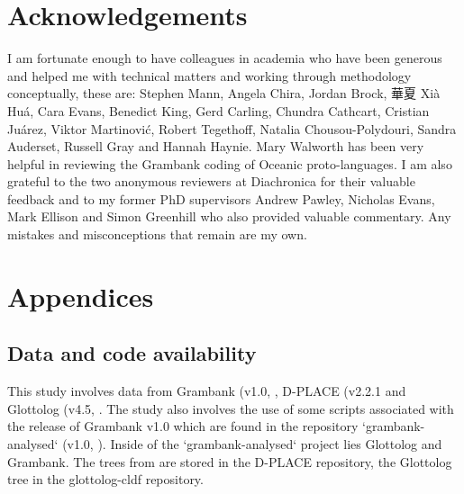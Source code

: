 \documentclass[12pt,letterpaper]{article}
\begin{document}



\FloatBarrier


\newpage
\section*{Acknowledgements}
I am fortunate enough to have colleagues in academia who have been generous and helped me with technical matters and working through methodology conceptually, these are: Stephen Mann, Angela Chira, Jordan Brock, 華夏 Xià Huá, Cara Evans, Benedict King, Gerd Carling, Chundra Cathcart, Cristian Juárez, Viktor Martinović, Robert Tegethoff, Natalia Chousou-Polydouri, Sandra Auderset, Russell Gray and Hannah Haynie. Mary Walworth has been very helpful in reviewing the Grambank coding of Oceanic proto-languages. I am also grateful to the two anonymous reviewers at Diachronica for their valuable feedback and to my former PhD supervisors Andrew Pawley, Nicholas Evans, Mark Ellison and Simon Greenhill who also provided valuable commentary. Any mistakes and misconceptions that remain are my own.


\newpage

\appendix
\section*{Appendices}
\renewcommand{\thesubsection}{\Alph{subsection}}

\subsection{Data and code availability}
\label{supp_data_availability}
This study involves data from Grambank (v1.0, \cite{grambank_dataset_zenodo_v1, grambank_release}, D-PLACE (v2.2.1 \citet{d_place_all} and Glottolog (v4.5, \citet{glottolog4_5}. The study also involves the use of some scripts associated with the release of Grambank v1.0 which are found in the repository `grambank-analysed` (v1.0, \citet{grambank_analysed_1_0}). Inside of the `grambank-analysed` project lies Glottolog and Grambank. The trees from \citet{grayetal_2009} are stored in the D-PLACE repository, the Glottolog tree in the glottolog-cldf repository.
\end{document}
